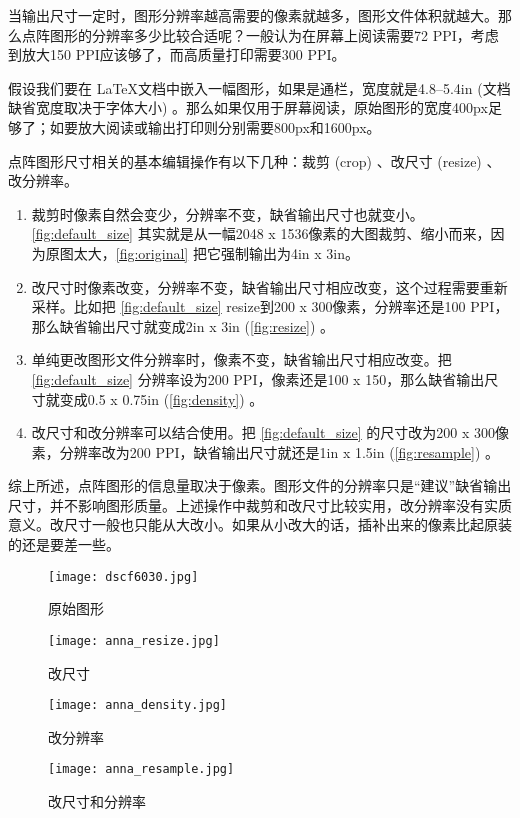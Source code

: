 当输出尺寸一定时，图形分辨率越高需要的像素就越多，图形文件体积就越大。那么点阵图形的分辨率多少比较合适呢？一般认为在屏幕上阅读需要72 PPI，考虑到放大150 PPI应该够了，而高质量打印需要300 PPI。

假设我们要在 \LaTeX 文档中嵌入一幅图形，如果是通栏，宽度就是4.8--5.4in (文档缺省宽度取决于字体大小) 。那么如果仅用于屏幕阅读，原始图形的宽度400px足够了；如要放大阅读或输出打印则分别需要800px和1600px。

点阵图形尺寸相关的基本编辑操作有以下几种：裁剪 (crop) 、改尺寸 (resize) 、改分辨率。

\begin{enumerate}
\item 裁剪时像素自然会变少，分辨率不变，缺省输出尺寸也就变小。\autoref{fig:default_size} 其实就是从一幅2048 x 1536像素的大图裁剪、缩小而来，因为原图太大，\autoref{fig:original} 把它强制输出为4in x 3in。

\item 改尺寸时像素改变，分辨率不变，缺省输出尺寸相应改变，这个过程需要重新采样。比如把 \autoref{fig:default_size} resize到200 x 300像素，分辨率还是100 PPI，那么缺省输出尺寸就变成2in x 3in (\autoref{fig:resize}) 。

\item 单纯更改图形文件分辨率时，像素不变，缺省输出尺寸相应改变。把 \autoref{fig:default_size} 分辨率设为200 PPI，像素还是100 x 150，那么缺省输出尺寸就变成0.5 x 0.75in (\autoref{fig:density}) 。

\item 改尺寸和改分辨率可以结合使用。把 \autoref{fig:default_size} 的尺寸改为200 x 300像素，分辨率改为200 PPI，缺省输出尺寸就还是1in x 1.5in (\autoref{fig:resample}) 。
\end{enumerate}

综上所述，点阵图形的信息量取决于像素。图形文件的分辨率只是“建议”缺省输出尺寸，并不影响图形质量。上述操作中裁剪和改尺寸比较实用，改分辨率没有实质意义。改尺寸一般也只能从大改小。如果从小改大的话，插补出来的像素比起原装的还是要差一些。

\begin{figure}[htbp]
\centering
\texttt{[image: dscf6030.jpg]}
\caption{原始图形}
\label{fig:original}
\end{figure}

\begin{figure}[!htbp]
\centering
\begin{minipage}[b]{2in}
\centering
\texttt{[image: anna\_resize.jpg]}
\caption{改尺寸}
\label{fig:resize}
\end{minipage}
\begin{minipage}[b]{1.1in}
\centering
\texttt{[image: anna\_density.jpg]}
\caption{改分辨率}
\label{fig:density}
\end{minipage}
\begin{minipage}[b]{1.6in}
\centering
\texttt{[image: anna\_resample.jpg]}
\caption{改尺寸和分辨率}
\label{fig:resample}
\end{minipage}
\end{figure}

